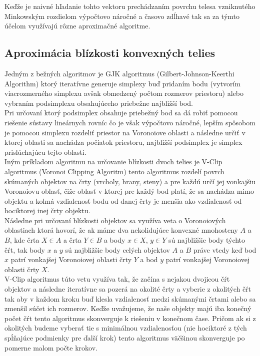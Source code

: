 \documentclass[a4paper]{article}
\begin{document}
	Keďže je naivné hľadanie tohto vektoru prechádzaním povrchu telesa vzniknutého Minkowským rozdielom výpočtovo náročné a časovo zdĺhavé tak sa za týmto účelom využívajú rôzne aproximačné algoritme.
	
	\subsection{Aproximácia blízkosti konvexných telies}
	
	Jedným z bežných algoritmov je GJK algoritmus (Gilbert-Johnson-Keerthi Algorithm) ktorý iteratívne generuje simplexy buď pridaním bodu (vytvorím viacrozmerného simplexu avšak obmedzený počtom rozmerov priestoru) alebo vybraním podsimplexu obsahujúceho priebežne najbližší bod. 
	\\
	
	Pri určovaní ktorý podsimplex obsahuje priebežný bod sa dá robiť pomocou riešenie sústavy lineárnych rovníc čo je však výpočtovo náročné, lepším spôsobom je pomocou simplexu rozdeliť priestor na Voronoiove oblasti a následne určiť v ktorej oblasti sa nachádza počiatok priestoru, najbližší podsimplex je simplex prislúchajúcu tejto oblasti. 
	\\
	
	Iným príkladom algoritmu na určovanie blízkosti dvoch telies je V-Clip algoritmus (Voronoi Clipping Algoritm) tento algoritmus rozdelí povrch skúmaných objektov na črty (vrcholy, hrany, steny) a pre každú určí jej vonkajšiu Voronoiovu oblasť, čiže oblasť v ktorej pre každý bod platí, že sa nachádza mimo objektu a kolmá vzdialenosť bodu od danej črty je menšia ako vzdialenosť od hociktorej inej črty objektu.
	\\
	
	Následne pri určovaní blízkosti objektov sa využíva veta o Voronoiových oblastiach ktorá hovorí, že ak máme dva nekolidujúce konvexné mnohosteny $A$ a $B$, kde črta $X \in A$ a črta $Y \in B$ a body $x \in X$, $y \in Y$ sú najbližšie body týchto čŕt, tak body $x$ a $y$ sú najbližšie body celých objektov $A$ a $B$ práve vtedy keď bod $x$ patrí vonkajšej Voronoiovej oblasti črty $Y$ a bod $y$ patrí vonkajšej Voronoiovej oblasti črty $X$.
	\\
	
	V-Clip algoritmus túto vetu využíva tak, že začína s nejakou dvojicou čŕt objektov a následne iteratívne sa pozerá na okolité črty a vyberie z okolitých čŕt tak aby v každom kroku buď klesla vzdialenosť medzi skúmanými črtami alebo sa zmenšil súčet ich rozmerov. Keďže uvažujeme, že naše objekty majú iba konečný počet čŕt tento algoritmus skonverguje k riešeniu v konečnom čase. Pričom ak si z okolitých budeme vyberať tie s minimálnou vzdialenosťou (nie hociktoré z tých spĺňajúce podmienky pre ďalší krok) tento algoritmus väčšinou skonverguje po pomerne malom počte krokov.   
	
\end{document}
